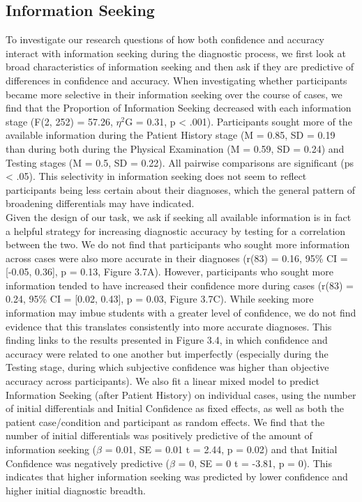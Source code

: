\documentclass[a4paper, nobind]{templates/ociamthesis}
\begin{document}
\newpage

\subsection*{Information Seeking}\label{information-seeking}

To investigate our research questions of how both confidence and accuracy interact with information seeking during the diagnostic process, we first look at broad characteristics of information seeking and then ask if they are predictive of differences in confidence and accuracy. When investigating whether participants became more selective in their information seeking over the course of cases, we find that the Proportion of Information Seeking decreased with each information stage (F(2, 252) = 57.26, \(\eta^2\)G = 0.31, p \textless{} .001). Participants sought more of the available information during the Patient History stage (M = 0.85, SD = 0.19 than during both during the Physical Examination (M = 0.59, SD = 0.24) and Testing stages (M = 0.5, SD = 0.22). All pairwise comparisons are significant (ps \textless{} .05). This selectivity in information seeking does not seem to reflect participants being less certain about their diagnoses, which the general pattern of broadening differentials may have indicated.\\

Given the design of our task, we ask if seeking all available information is in fact a helpful strategy for increasing diagnostic accuracy by testing for a correlation between the two. We do not find that participants who sought more information across cases were also more accurate in their diagnoses (r(83) = 0.16, 95\% CI = {[}-0.05, 0.36{]}, p = 0.13, Figure 3.7A). However, participants who sought more information tended to have increased their confidence more during cases (r(83) = 0.24, 95\% CI = {[}0.02, 0.43{]}, p = 0.03, Figure 3.7C). While seeking more information may imbue students with a greater level of confidence, we do not find evidence that this translates consistently into more accurate diagnoses. This finding links to the results presented in Figure 3.4, in which confidence and accuracy were related to one another but imperfectly (especially during the Testing stage, during which subjective confidence was higher than objective accuracy across participants). We also fit a linear mixed model to predict Information Seeking (after Patient History) on individual cases, using the number of initial differentials and Initial Confidence as fixed effects, as well as both the patient case/condition and participant as random effects. We find that the number of initial differentials was positively predictive of the amount of information seeking (\(\beta\) = 0.01, SE = 0.01 t = 2.44, p = 0.02) and that Initial Confidence was negatively predictive (\(\beta\) = 0, SE = 0 t = -3.81, p = 0). This indicates that higher information seeking was predicted by lower confidence and higher initial diagnostic breadth.
\end{document}
